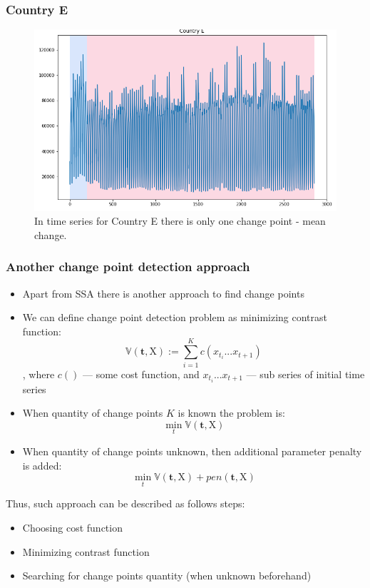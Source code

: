 \documentclass[intlimits, 9pt, unicode]{beamer}
\begin{document}
\begin{frame}
    \frametitle{Country E}
\begin{figure}
	\includegraphics[scale=0.30]{images/032_country_e}
	In time series for Country E there is only one change point - mean change.
\end{figure}
\end{frame}




\begin{frame}
    \frametitle{Another change point detection approach}
	
	\begin{itemize}
		\item Apart from SSA there is another approach to find change points
		\item We can define change point detection problem as minimizing contrast function:
		$$ \mathbb{V}(\mathbf{t},\mathrm{X}) := \sum_{i=1}^K c(x_{t_i}...x_{t+1}) $$, where $c()$ --- some cost function, and $x_{t_i}...x_{t+1}$ --- sub series of initial time series
		\item When quantity of change points $K$ is known the problem is:
		$$ \min_t{\mathbb{V}(\mathbf{t},\mathrm{X})} $$
		\item When quantity of change points unknown, then additional parameter penalty is added:
		$$ \min_t{\mathbb{V}(\mathbf{t},\mathrm{X})} + pen(\mathbf{t},\mathrm{X}) $$
	\end{itemize}

Thus, such approach can be described as follows steps:

	\begin{itemize}
		\item Choosing cost function
		\item Minimizing contrast function
		\item Searching for change points quantity (when unknown beforehand)
	\end{itemize}
\end{frame}
\end{document}
